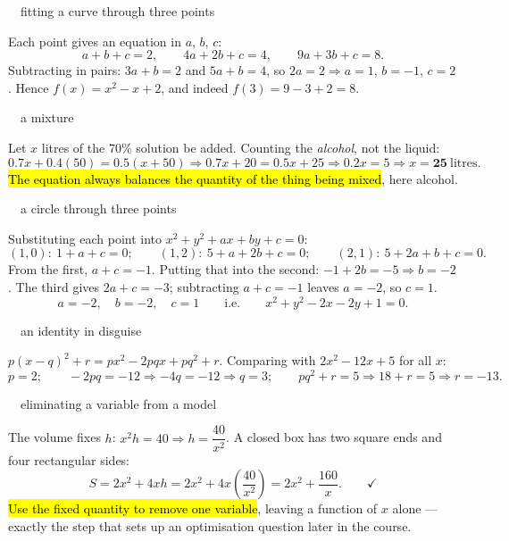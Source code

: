 \documentclass[11pt]{article}
\newcommand{\key}[1]{\hl{#1}}
\newcommand{\solhead}[2]{\medskip{\color{lilacdeep}\bfseries Q#1.}\ \ {\color{greyish}\footnotesize #2}\par\nobreak}
\begin{document}
\solhead{29}{fitting a curve through three points}
Each point gives an equation in $a$, $b$, $c$:
\[a+b+c=2,\qquad 4a+2b+c=4,\qquad 9a+3b+c=8.\]
Subtracting in pairs: $3a+b=2$ and $5a+b=4$, so $2a=2\Rightarrow a=1$, $b=-1$, $c=2$. Hence
$f(x)=x^{2}-x+2$, and indeed $f(3)=9-3+2=8$.\ \checkmark

\solhead{30}{a mixture}
Let $x$ litres of the 70\% solution be added. Counting the \emph{alcohol}, not the liquid:
\[0.7x+0.4(50)=0.5(x+50)\Rightarrow0.7x+20=0.5x+25\Rightarrow0.2x=5\Rightarrow x=\mathbf{25}\ \text{litres}.\]
\key{The equation always balances the quantity of the thing being mixed}, here alcohol.

\solhead{31}{a circle through three points}
Substituting each point into $x^{2}+y^{2}+ax+by+c=0$:
\[(1,0):\ 1+a+c=0;\qquad(1,2):\ 5+a+2b+c=0;\qquad(2,1):\ 5+2a+b+c=0.\]
From the first, $a+c=-1$. Putting that into the second: $-1+2b=-5\Rightarrow b=-2$. The third gives $2a+c=-3$; subtracting $a+c=-1$ leaves $a=-2$, so $c=1$.
\[a=-2,\quad b=-2,\quad c=1\qquad\text{i.e.}\qquad x^{2}+y^{2}-2x-2y+1=0.\]

\solhead{32}{an identity in disguise}
$p(x-q)^{2}+r=px^{2}-2pqx+pq^{2}+r$. Comparing with $2x^{2}-12x+5$ for all $x$:
\[p=2;\qquad-2pq=-12\Rightarrow-4q=-12\Rightarrow q=3;\qquad pq^{2}+r=5\Rightarrow18+r=5\Rightarrow r=-13.\]

\solhead{33}{eliminating a variable from a model}
The volume fixes $h$: $x^{2}h=40\Rightarrow h=\dfrac{40}{x^{2}}$. A closed box has two square ends and four rectangular sides:
\[S=2x^{2}+4xh=2x^{2}+4x\left(\frac{40}{x^{2}}\right)=2x^{2}+\frac{160}{x}. \qquad\checkmark\]
\key{Use the fixed quantity to remove one variable}, leaving a function of $x$ alone --- exactly the step that sets up an optimisation question later in the course.
\end{document}
